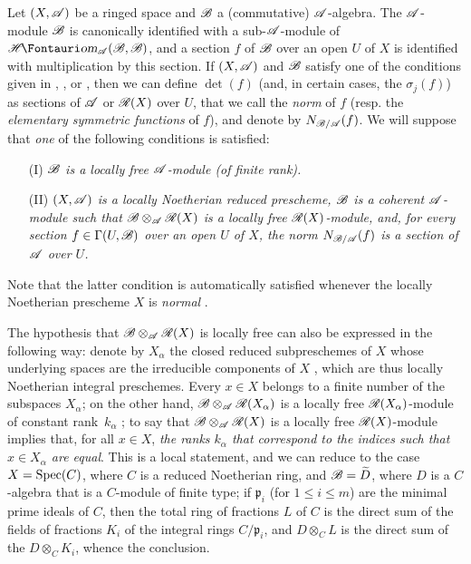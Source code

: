 \begin{env}[6.5.1]
\label{II.6.5.1}
Let $(X,\mathscr{A})$ be a ringed space and $\mathscr{B}$ a (commutative) $\mathscr{A}$-algebra.
The $\mathscr{A}$-module $\mathscr{B}$ is canonically identified with a sub-$\mathscr{A}$-module of $\shHom_{\sh{A}}(\sh{B},\sh{B})$, and a section $f$ of $\mathscr{B}$ over an open $U$ of $X$ is identified with multiplication by this section.
If $(X,\mathscr{A})$ and $\mathscr{B}$ satisfy one of the conditions given in , , or , then we can define $\det(f)$ (and, in certain cases, the $\sigma_j(f)$) as sections of $\mathscr{A}$ or $\mathscr{R}(X)$ over $U$, that we call the \emph{norm} of $f$ (resp. the \emph{elementary symmetric functions} of $f$), and denote by $N_{\mathscr{B}/\mathscr{A}}(f)$.
We will suppose that \emph{one} of the following conditions is satisfied:
\begin{enumerate}
  \item[(I)] \emph{$\mathscr{B}$ is a locally free $\mathscr{A}$-module (of finite rank).}
  \item[(II)] \emph{$(X,\mathscr{A})$ is a locally Noetherian reduced prescheme, $\mathscr{B}$ is a coherent $\mathscr{A}$-module such that $\mathscr{B}\otimes_{\mathscr{A}}\mathscr{R}(X)$ is a locally free $\mathscr{R}(X)$-module, and, for every section $f\in\Gamma(U,\mathscr{B})$ over an open $U$ of $X$, the norm $N_{\mathscr{B}/\mathscr{A}}(f)$ is a section of $\mathscr{A}$ over $U$.}
\end{enumerate}

Note that the latter condition is automatically satisfied whenever the locally Noetherian prescheme $X$ is \emph{normal} .

The hypothesis that $\mathscr{B}\otimes_{\mathscr{A}}\mathscr{R}(X)$ is locally free can also be expressed in the following way: denote by $X_\alpha$ the closed reduced subpreschemes of $X$ whose underlying spaces are the irreducible components of $X$ , which are thus locally Noetherian integral preschemes.
Every $x\in X$ belongs to a finite number of the subspaces $X_\alpha$;
on the other hand, $\mathscr{B}\otimes_{\mathscr{A}}\mathscr{R}(X_\alpha)$ is a locally free $\mathscr{R}(X_\alpha)$-module of constant rank~$k_\alpha$ ;
to say that $\mathscr{B}\otimes_{\mathscr{A}}\mathscr{R}(X)$ is a locally free $\mathscr{R}(X)$-module implies that, for all $x\in X$, \emph{the ranks $k_\alpha$ that correspond to the indices such that $x\in X_\alpha$ are equal}.
This is a local statement, and we can reduce to the case $X=\operatorname{Spec}(C)$, where $C$ is a reduced Noetherian ring, and $\mathscr{B}=\widetilde{D}$, where $D$ is a $C$-algebra that is a $C$-module of finite type;
if $\mathfrak{p}_i$ (for $1\leq i\leq m$) are the minimal prime ideals of $C$, then the total ring of fractions $L$ of $C$ is the direct sum of the fields of fractions $K_i$ of the integral rings $C/\mathfrak{p}_i$, and $D\otimes_C L$ is the direct sum of the $D\otimes_C K_i$, whence the conclusion.


\end{env}
